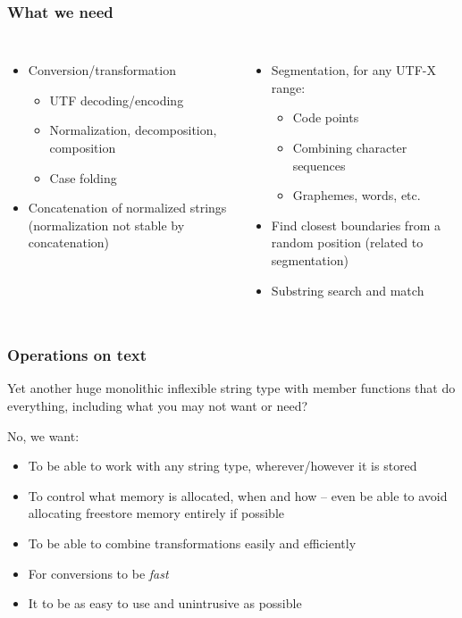 \documentclass{beamer}
\begin{document}
\begin{frame}
	\frametitle{What we need}
	
	\begin{columns}[t]
	
	
	\begin{itemize}
	
	\item Conversion/transformation
	\begin{itemize}
		\item UTF decoding/encoding
		\item Normalization, decomposition, composition
		\item Case folding
	\end{itemize}
	
	\item Concatenation of normalized strings (normalization not stable by concatenation)	
	
	\end{itemize}
	
	\begin{itemize}
	\item Segmentation, for any UTF-X range:
	\begin{itemize}
		\item Code points
		\item Combining character sequences
		\item Graphemes, words, etc.
	\end{itemize}	
	
	\item Find closest boundaries from a random position (related to segmentation)
	\item Substring search and match
	
	\end{itemize}
	
	\end{columns}
		
\end{frame}

\begin{frame}
	\frametitle{Operations on text}
	
	Yet another huge monolithic inflexible string type with member functions that do everything,
	including what you may not want or need?
	\bigskip
	
	No, we want:
	\begin{itemize}
		\item To be able to work with any string type, wherever/however it is stored
		\item To control what memory is allocated, when and how -- even be able to avoid allocating freestore memory entirely if possible
		\item To be able to combine transformations easily and efficiently
		\item For conversions to be \textit{fast}
		\item It to be as easy to use and unintrusive as possible
	\end{itemize}

\end{frame}
\end{document}
